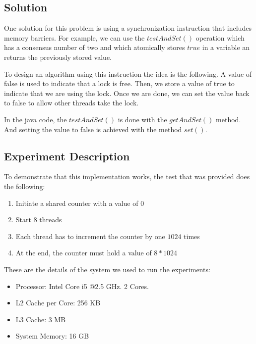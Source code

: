 \subsection{Solution}
\par
One solution for this problem is using a synchronization instruction that
includes memory barriers. For example, we can use the $testAndSet()$ operation
which has a consensus number of two and which atomically stores $true$ in a
variable an returns the previously stored value. 
\par
To design an algorithm using this instruction the idea is the following. A value
of false is used to indicate that a lock is free. Then, we store a value of true
to indicate that we are using the lock. Once we are done, we can set the value
back to false to allow other threads take the lock.
\par
In the java code, the $testAndSet()$ is done with the $getAndSet()$ method. And
setting the value to false is achieved with the method $set()$.
\par
\subsection{Experiment Description}
\par
To demonstrate that this implementation works, the test that was provided does
the following:
\begin{enumerate}
\item Initiate a shared counter with a value of $0$
\item Start $8$ threads
\item Each thread has to increment the counter by one $1024$ times
\item At the end, the counter must hold a value of $8*1024$
\end{enumerate}
\par
These are the details of the system we used to run the experiments:
\begin{itemize}
\item Processor: Intel Core i5 @2.5 GHz. 2 Cores.
\item L2 Cache per Core: 256 KB
\item L3 Cache: 3 MB
\item System Memory: 16 GB
\end{itemize}
